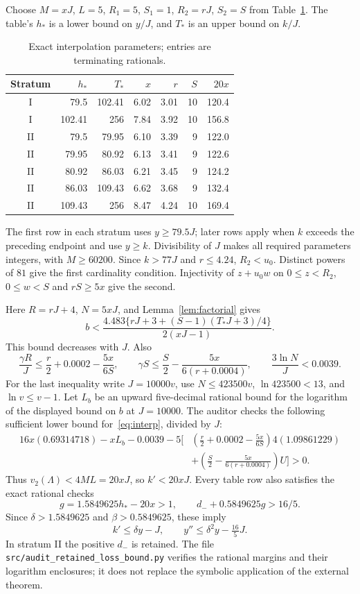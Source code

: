 \documentclass[11pt]{article}
\theoremstyle{definition}\newtheorem{definition}[theorem]{Definition}
\newcommand{\val}{v_2}
\begin{document}
Choose $M=xJ$, $L=5$, $R_1=5$, $S_1=1$, $R_2=rJ$, $S_2=S$ from Table~\ref{tab:params}. The table's $h_*$ is a lower bound on $y/J$, and $T_*$ is an upper bound on $k/J$.
\begin{table}[ht]
\centering\small
\begin{tabular}{crrrrrr}\toprule
Stratum &$h_*$&$T_*$&$x$&$r$&$S$&$20x$\\\midrule
I &79.5&102.41&6.02&3.01&10&120.4\\
I &102.41&256&7.84&3.92&10&156.8\\
II&79.5&79.95&6.10&3.39&9&122.0\\
II&79.95&80.92&6.13&3.41&9&122.6\\
II&80.92&86.03&6.21&3.45&9&124.2\\
II&86.03&109.43&6.62&3.68&9&132.4\\
II&109.43&256&8.47&4.24&10&169.4\\\bottomrule
\end{tabular}
\caption{Exact interpolation parameters; entries are terminating rationals.}\label{tab:params}
\end{table}
\FloatBarrier
The first row in each stratum uses $y\ge79.5J$; later rows apply when $k$ exceeds the preceding endpoint and use $y\ge k$. Divisibility of $J$ makes all required parameters integers, with $M\ge60200$. Since $k>77J$ and $r\le4.24$, $R_2<u_0$. Distinct powers of $81$ give the first cardinality condition. Injectivity of $z+u_0w$ on $0\le z<R_2$, $0\le w<S$ and $rS\ge5x$ give the second.

Here $R=rJ+4$, $N=5xJ$, and Lemma~\ref{lem:factorial} gives
\[
 b<\frac{4.483\{rJ+3+(S-1)(T_*J+3)/4\}}{2(xJ-1)}.
\]
This bound decreases with $J$. Also
\[
 \frac{\gamma R}{J}\le\frac r2+0.0002-\frac{5x}{6S},\qquad
 \gamma S\le\frac S2-\frac{5x}{6(r+0.0004)},\qquad
 \frac{3\ln N}{J}<0.0039.
\]
For the last inequality write $J=10000v$, use $N\le423500v$, $\ln423500<13$, and $\ln v\le v-1$. Let $L_b$ be an upward five-decimal rational bound for the logarithm of the displayed bound on $b$ at $J=10000$. The auditor checks the following sufficient lower bound for~\eqref{eq:interp}, divided by $J$:
\begin{align*}
16x(0.69314718)-xL_b-0.0039
-5\bigg[&\left(\frac r2+0.0002-\frac{5x}{6S}\right)4(1.09861229)\\
&+\left(\frac S2-\frac{5x}{6(r+0.0004)}\right)U\bigg]>0.
\end{align*}
Thus $\val(\Lambda)<4ML=20xJ$, so $k'<20xJ$. Every table row also satisfies the exact rational checks
\[
 g=1.5849625h_*-20x>1,\qquad d_-+0.5849625g>16/5.
\]
Since $\delta>1.5849625$ and $\beta>0.5849625$, these imply
\begin{equation}\label{eq:localloss}
 k'\le\delta y-J,\qquad y''\le\delta^2y-\tfrac{16}{5}J.
\end{equation}
In stratum II the positive $d_-$ is retained. The file \texttt{src/audit\_retained\_loss\_bound.py} verifies the rational margins and their logarithm enclosures; it does not replace the symbolic application of the external theorem.
\end{document}
